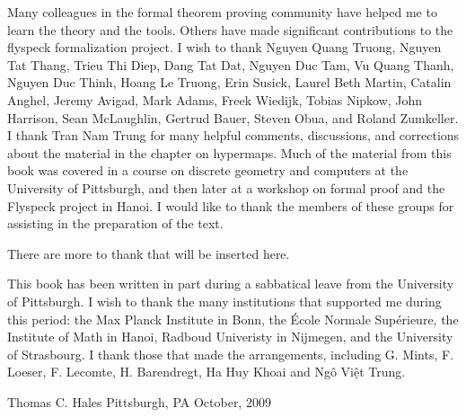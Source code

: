 Many colleagues in the formal theorem proving community have helped me to learn the theory and the tools.  Others have made significant contributions to the flyspeck formalization project.  I wish to thank 
Nguyen Quang Truong, %
Nguyen Tat Thang, %
Trieu Thi Diep, Dang Tat Dat, Nguyen Duc Tam, Vu Quang Thanh, Nguyen Duc Thinh,  Hoang Le Truong,
Erin Susick, Laurel Beth Martin, Catalin Anghel,
Jeremy Avigad, Mark Adams, Freek Wiedijk,  Tobias Nipkow, John Harrison, Sean McLaughlin, Gertrud Bauer, Steven Obua, and Roland Zumkeller.   
 I thank Tran Nam Trung for many helpful comments, discussions, and corrections about the material in the chapter on hypermaps.
Much of the material from this book was covered in a course on discrete geometry and computers at the University of Pittsburgh, and then later at a workshop on formal proof and the Flyspeck project in Hanoi.  I would like to thank the members of these groups for assisting in the preparation of the text.

\begin{note}%
There are more to thank that will be inserted here.
\end{note}

This book has been written in part during a sabbatical leave from the University of Pittsburgh.  I wish to thank the many institutions that supported
me during this period: the Max Planck Institute in Bonn, the \'Ecole Normale Sup\'erieure,  the Institute of Math
in Hanoi, Radboud Univeristy in Nijmegen, and the University of Strasbourg.
I thank those that made the arrangements, including G. Mints, F. Loeser, F. Lecomte, H. Barendregt, Ha Huy Khoai and Ng\^o Vi\d{\^e}t Trung.


\bigskip
\hbox{}



\bigskip
\hbox{}

{
\parindent=0pt
\obeylines

Thomas C. Hales
Pittsburgh, PA
October, 2009

}







